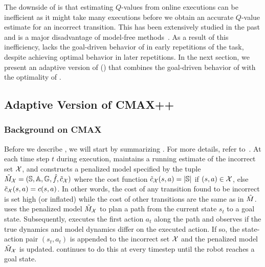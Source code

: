 The downside of \cmaxpp{} is that estimating $Q$-values from online
executions can be inefficient as it might take many executions before
we obtain an accurate $Q$-value estimate for an incorrect
transition. This has been extensively studied in the past and is a
major disadvantage of model-free
methods~\cite{DBLP:conf/colt/SunJKA019}. As a result of this
inefficiency, \cmaxpp{} lacks the goal-driven behavior of \cmax{} in
early repetitions of the task, despite achieving optimal behavior in
later repetitions. In the next section, we present an adaptive version
of \cmaxpp{} (\acmaxpp{}) that combines the goal-driven behavior of \cmax{} with
the optimality of \cmaxpp{}.



\subsection{Adaptive Version of CMAX++}
\label{sec:adaptive}


\subsubsection{Background on CMAX}
\label{sec:background-cmax}
Before we describe \acmaxpp{}, we will start by summarizing
\cmax{}. For more details, refer 
to~\cite{cmax}.
At each time step $t$ during execution, \cmax{} maintains a running
estimate of the incorrect set $\mathcal{X}$, and constructs a
penalized model specified by the tuple $\tilde{M}_{\mathcal{X}} =
(\mathbb{S}, \mathbb{A}, \mathbb{G}, \hat{f},
\tilde{c}_{\mathcal{X}})$ where the cost function
$\tilde{c}_{\mathcal{X}}(s, a) = |\mathbb{S}|$ if $(s, a) \in
\mathcal{X}$, else $\tilde{c}_{\mathcal{X}}(s, a) = c(s, a)$. In
other words, the cost of any transition found to be incorrect is
set high (or inflated) while the cost of other transitions are the
same as in $\hat{M}$.
\cmax{} uses the penalized model $\tilde{M}_{\mathcal{X}}$ to plan a path from the
current state $s_t$ to a goal state. Subsequently, \cmax{} executes
the first action $a_t$ along the path and observes if the true
dynamics and model dynamics differ on the executed action. If so, the
state-action pair $(s_t, a_t)$ is appended to the incorrect set
$\mathcal{X}$  and the penalized model $\tilde{M}_{\mathcal{X}}$ is updated.
\cmax{} continues to do this at every
timestep until the robot reaches a goal state.

